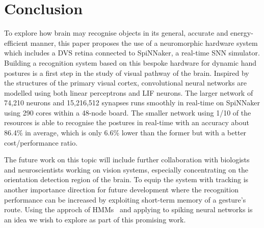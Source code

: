 \chapter{Conclusion}
\label{cha:con}
To explore how brain may recognise objects in its general, accurate and energy-efficient manner, this paper proposes the use of a neuromorphic hardware system which includes a DVS retina connected to SpiNNaker, a real-time SNN simulator.
Building a recognition system based on this bespoke hardware for dynamic hand postures is a first step in the study of visual pathway of the brain.
Inspired by the structures of the primary visual cortex, convolutional neural networks are modelled using both linear perceptrons and LIF neurons.
The larger network of 74,210 neurons and 15,216,512 synapses runs smoothly in real-time on SpiNNaker using 290 cores within a 48-node board.
The smaller network using 1/10 of the resources is able to recognise the postures in real-time with an accuracy about 86.4\% in average, which is 
only 6.6\% lower than the former but with a better cost/performance ratio.

The future work on this topic will include further collaboration with biologists and neuroscientists working on vision systems, especially concentrating on the orientation detection region of the brain.
To equip the system with tracking is another importance direction for future development where the recognition performance can be increased by exploiting short-term memory of a gesture's route.
Using the approch of HMMs~\cite{elmezain2009hidden} and applying to spiking neural networks is an idea we wish to explore as part of this promising work.

